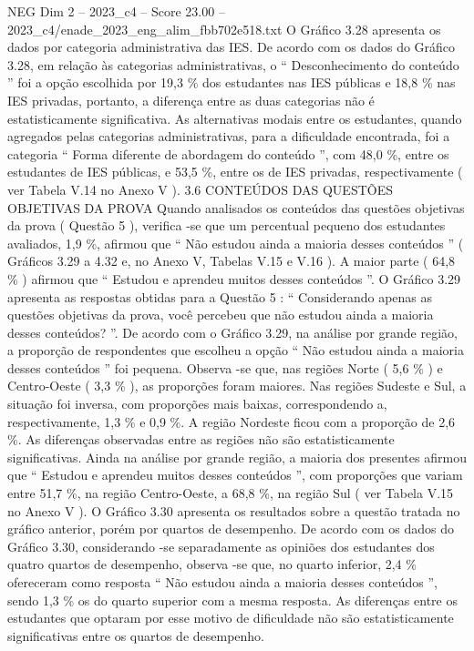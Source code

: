 \begin{textsample}{NEG Dim 2 – 2023\_c4 – Score 23.00 – 2023\_c4/enade\_2023\_eng\_alim\_fbb702e518.txt}
O Gráfico 3.28 apresenta os dados por categoria administrativa das IES.
De acordo com os dados do Gráfico 3.28, em relação às categorias administrativas, o “ Desconhecimento do conteúdo ” foi a opção escolhida por 19,3 \% dos estudantes nas IES públicas e 18,8 \% nas IES privadas, portanto, a diferença entre as duas categorias não é estatisticamente significativa.
As alternativas modais entre os estudantes, quando agregados pelas categorias administrativas, para a dificuldade encontrada, foi a categoria “ Forma diferente de abordagem do conteúdo ”, com 48,0 \%, entre os estudantes de IES públicas, e 53,5 \%, entre os de IES privadas, respectivamente ( ver Tabela V.14 no Anexo V ). 3.6 CONTEÚDOS DAS QUESTÕES OBJETIVAS DA PROVA Quando analisados os conteúdos das questões objetivas da prova ( Questão 5 ), verifica -se que um percentual pequeno dos estudantes avaliados, 1,9 \%, afirmou que “ Não estudou ainda a maioria desses conteúdos ” ( Gráficos 3.29 a 4.32 e, no Anexo V, Tabelas V.15 e V.16 ).
A maior parte ( 64,8 \% ) afirmou que “ Estudou e aprendeu muitos desses conteúdos ”.
O Gráfico 3.29 apresenta as respostas obtidas para a Questão 5 : “ Considerando apenas as questões objetivas da prova, você percebeu que não estudou ainda a maioria desses conteúdos? ”.
De acordo com o Gráfico 3.29, na análise por grande região, a proporção de respondentes que escolheu a opção “ Não estudou ainda a maioria desses conteúdos ” foi pequena.
Observa -se que, nas regiões Norte ( 5,6 \% ) e Centro-Oeste ( 3,3 \% ), as proporções foram maiores.
Nas regiões Sudeste e Sul, a situação foi inversa, com proporções mais baixas, correspondendo a, respectivamente, 1,3 \% e 0,9 \%.
A região Nordeste ficou com a proporção de 2,6 \%.
As diferenças observadas entre as regiões não são estatisticamente significativas.
Ainda na análise por grande região, a maioria dos presentes afirmou que “ Estudou e aprendeu muitos desses conteúdos ”, com proporções que variam entre 51,7 \%, na região Centro-Oeste, a 68,8 \%, na região Sul ( ver Tabela V.15 no Anexo V ).
O Gráfico 3.30 apresenta os resultados sobre a questão tratada no gráfico anterior, porém por quartos de desempenho.
De acordo com os dados do Gráfico 3.30, considerando -se separadamente as opiniões dos estudantes dos quatro quartos de desempenho, observa -se que, no quarto inferior, 2,4 \% ofereceram como resposta “ Não estudou ainda a maioria desses conteúdos ”, sendo 1,3 \% os do quarto superior com a mesma resposta.
As diferenças entre os estudantes que optaram por esse motivo de dificuldade não são estatisticamente significativas entre os quartos de desempenho.

\end{textsample}
